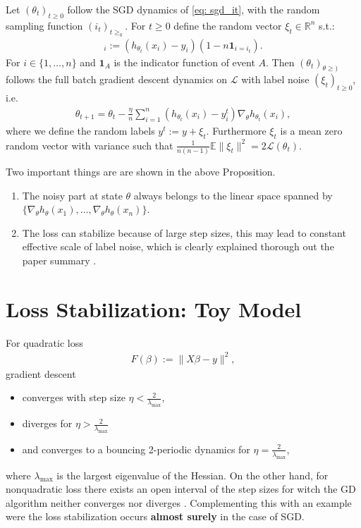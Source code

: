 \begin{proposition}
    Let $(\theta_t)_{t\ge 0 }$ follow the SGD dynamics of \ref{eq: sgd_it},
    with the random sampling function $(i_t)_{t\ge_0}$. For $t\ge 0$ define
    the random vector $\xi_t \in \mathbb{R}^{n}$ s.t.:
    \begin{align}
        [\xi_t]_i := (h_{\theta_t}(x_i) - y_i)(1-n\mathbf{1}_{i=i_t}).
    \end{align}
    For $i \in \{1,\ldots,n\}$ and $\mathbf{1}_{A}$ is the indicator function
    of event $A$. Then $(\theta_t)_{\theta\ge )}$ follows the full batch
    gradient descent dynamics on $\mathcal{L}$ with label noise
    $(\xi_t)_{t\ge 0}$, i.e.
    \begin{align}
        \theta_{t+1} = \theta_t - \frac{\eta}{n} \sum_{i=1}^{n}
        \left( h_{\theta_t}(x_i) - y_i^{t} \right)
        \nabla_{\theta}h_{\theta_t}(x_i),
    \end{align}
    where we define the random labels $y^{t} := y + \xi_t$. Furthermore
    $\xi_t$ is a mean zero random vector with variance such that
    $\frac{1}{n(n-1)}\mathbb{E}\|\xi_t\|^{2} = 2 \mathcal{L}(\theta_t)$.
\end{proposition}
Two important things are are shown in the above Proposition.
\begin{enumerate}
    \item The noisy part at state $\theta$ always belongs to the linear space
        spanned by $\{\nabla_\theta h_\theta(x_1),\ldots, \nabla_\theta
        h_\theta(x_n)\}$.

    \item The loss can stabilize because of large step sizes, this may lead
        to constant effective scale of label noise, which is clearly
        explained thorough out the paper summary \cite{andriushchenko2023sgd}.
\end{enumerate}
\section{Loss Stabilization: Toy Model}
For quadratic loss
\begin{align}
F(\beta) := \|X\beta - y\|^{2},
\end{align}
gradient descent
\begin{itemize}
    \item  converges with step size $\eta < \frac{2}{\lambda_{\text{max}}}$,
    \item diverges for $\eta > \frac{2}{\lambda_{\text{max}}}$
    \item  and converges to a bouncing 2-periodic dynamics for $\eta =
        \frac{2}{\lambda_{\text{max}}}$,
\end{itemize}
where $\lambda_{\text{max}}$ is the largest eigenvalue of the Hessian. On the
other hand, for nonquadratic loss there exists an open interval of the step
sizes for witch the GD algorithm neither converges nor diverges
\cite{andriushchenko2023sgd}. Complementing this with an example were the
loss stabilization occurs \textbf{almost surely} in the case of SGD.
\newline

